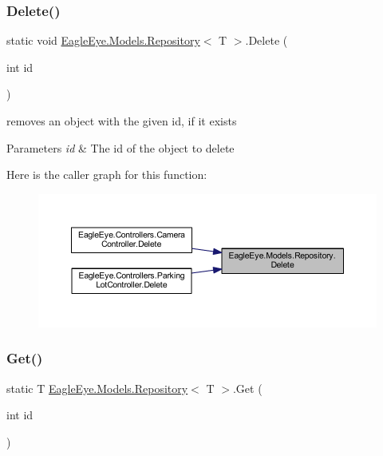 \subsubsection{\texorpdfstring{Delete()}{Delete()}}
{\footnotesize\ttfamily static void \mbox{\hyperlink{class_eagle_eye_1_1_models_1_1_repository}{Eagle\+Eye.\+Models.\+Repository}}$<$ T $>$.Delete (\begin{DoxyParamCaption}\item[{int}]{id }\end{DoxyParamCaption})\hspace{0.3cm}{\ttfamily [static]}}



removes an object with the given id, if it exists 


\begin{DoxyParams}{Parameters}
{\em id} & The id of the object to delete\\
\hline
\end{DoxyParams}
Here is the caller graph for this function\+:
\nopagebreak
\begin{figure}[H]
\begin{center}
\leavevmode
\includegraphics[width=350pt]{class_eagle_eye_1_1_models_1_1_repository_ad50f201c8f5f1c7794ddf068ed459854_icgraph}
\end{center}
\end{figure}
\mbox{\label{class_eagle_eye_1_1_models_1_1_repository_ac44cb18d8cbb605d3f7e14eb09c8c0bf}} 
\subsubsection{\texorpdfstring{Get()}{Get()}}
{\footnotesize\ttfamily static T \mbox{\hyperlink{class_eagle_eye_1_1_models_1_1_repository}{Eagle\+Eye.\+Models.\+Repository}}$<$ T $>$.Get (\begin{DoxyParamCaption}\item[{int}]{id }\end{DoxyParamCaption})\hspace{0.3cm}{\ttfamily [static]}}



